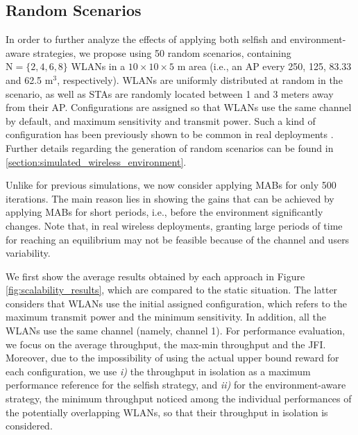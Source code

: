 \documentclass[preprint,12pt]{elsarticle}
\begin{document}
\subsection{Random Scenarios}
\label{section:scalability}	
In order to further analyze the effects of applying both selfish and environment-aware strategies, we propose using 50 random scenarios, containing $\text{N} = \{2, 4, 6, 8\}$ WLANs in a $10\times10\times5$ m area (i.e., an AP every 250, 125, 83.33 and 62.5 $\text{m}^3$, respectively). WLANs are uniformly distributed at random in the scenario, as well as STAs are randomly located between 1 and 3 meters away from their AP. Configurations are assigned so that WLANs use the same channel by default, and maximum sensitivity and transmit power. Such a kind of configuration has been previously shown to be common in real deployments \cite{akella2007self}. Further details regarding the generation of random scenarios can be found in \ref{section:simulated_wireless_environment}.

Unlike for previous simulations, we now consider applying MABs for only 500 iterations. The main reason lies in showing the gains that can be achieved by applying MABs for short periods, i.e., before the environment significantly changes. Note that, in real wireless deployments, granting large periods of time for reaching an equilibrium may not be feasible because of the channel and users variability.

We first show the average results obtained by each approach in Figure \ref{fig:scalability_results}, which are compared to the static situation. The latter considers that WLANs use the initial assigned configuration, which refers to the maximum transmit power and the minimum sensitivity. In addition, all the WLANs use the same channel (namely, channel 1). For performance evaluation, we focus on the average throughput, the max-min throughput and the JFI. Moreover, due to the impossibility of using the actual upper bound reward for each configuration, we use \emph{i)} the throughput in isolation as a maximum performance reference for the selfish strategy, and \emph{ii)} for the environment-aware strategy, the minimum throughput noticed among the individual performances of the potentially overlapping WLANs, so that their throughput in isolation is considered.
\end{document}
